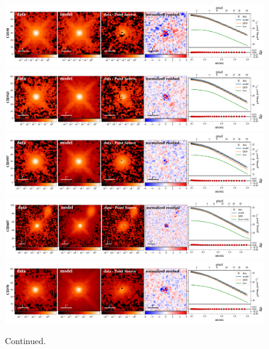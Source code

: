 \documentclass[apj]{emulateapj}
\begin{document}
\begin{figure}
\centering
{
\includegraphics[height=0.25\textwidth]{fig/best_fit_CID50_SB_profile.pdf}
\includegraphics[height=0.25\textwidth]{fig/best_fit_CID543_SB_profile.pdf}
\includegraphics[height=0.25\textwidth]{fig/best_fit_CID597_SB_profile.pdf}
\includegraphics[height=0.25\textwidth]{fig/best_fit_CID607_SB_profile.pdf}
\includegraphics[height=0.25\textwidth]{fig/best_fit_CID70_SB_profile.pdf}
}
\caption{Continued.}
\end{figure} 
\end{document}
